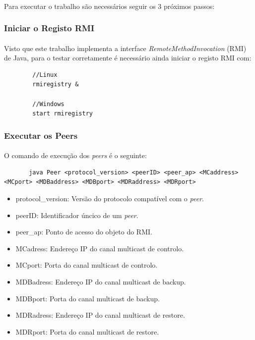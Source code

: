 \documentclass[11pt,oneside]{book}
\begin{document}
\paragraph{}
    Para executar o trabalho são necessários seguir os 3 próximos passos:
    
    \subsubsection{Iniciar o Registo RMI}
    \paragraph{}
    Visto que este trabalho implementa a interface \textit{RemoteMethodInvocation} (RMI) de
    Java, para o testar corretamente é necessário ainda iniciar o registo RMI com:
    \begin{lstlisting}
        //Linux
        rmiregistry &

        //Windows
        start rmiregistry
    \end{lstlisting}
    
    \subsubsection{Executar os Peers}
    \paragraph{}
    O comando de execução dos \textit{peers} é o seguinte:
    \begin{lstlisting}
       java Peer <protocol_version> <peerID> <peer_ap> <MCaddress> <MCport> <MDBaddress> <MDBport> <MDRaddress> <MDRport>
    \end{lstlisting}
    \begin{itemize}
        \item protocol\_version: Versão do protocolo compatível com o \textit{peer}.
        \item peerID: Identificador úncico de um \textit{peer}.
        \item peer\_ap: Ponto de acesso do objeto do RMI.
        \item MCadress: Endereço IP do canal multicast de controlo.
        \item MCport: Porta do canal multicast de controlo.
        \item MDBadress: Endereço IP do canal multicast de backup.
        \item MDBport: Porta do canal multicast de backup.
        \item MDRadress: Endereço IP do canal multicast de restore.
        \item MDRport: Porta do canal multicast de restore.
    \end{itemize}
\end{document}
